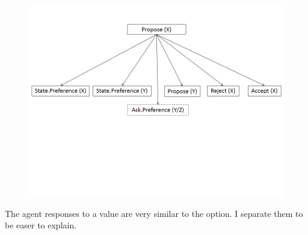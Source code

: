 \documentclass{llncs}
\begin{document}
\begin{figure}
\centerline{\includegraphics[width=5in]{figs/proposeX.PNG}}

\end{figure}
\par The agent responses to a value are very similar to the option. I separate them to be easer to explain. 
\end{document}

